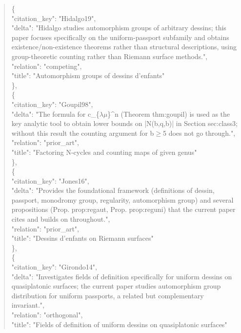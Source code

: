 \documentclass[11pt]{article}
\begin{document}
\begin{quote}
    \{\\
      "citation\_key": "Hidalgo19",\\
      "delta": "Hidalgo studies automorphism groups of arbitrary dessins; this paper focuses specifically on the uniform-passport subfamily and obtains existence/non-existence theorems rather than structural descriptions, using group-theoretic counting rather than Riemann surface methods.",\\
      "relation": "competing",\\
      "title": "Automorphism groups of dessins d'enfants"\\
    \},\\
    \{\\
      "citation\_key": "Goupil98",\\
      "delta": "The formula for c\_\{\ensuremath{\lambda}\ensuremath{\mu}\}\^{}n (Theorem thm:goupil) is used as the key analytic tool to obtain lower bounds on |N(b,q,b)| in Section sec:class3; without this result the counting argument for b\ensuremath{\ge}5 does not go through.",\\
      "relation": "prior\_art",\\
      "title": "Factoring N-cycles and counting maps of given genus"\\
    \},\\
    \{\\
      "citation\_key": "Jones16",\\
      "delta": "Provides the foundational framework (definitions of dessin, passport, monodromy group, regularity, automorphism group) and several propositions (Prop. prop:regaut, Prop. prop:reguni) that the current paper cites and builds on throughout.",\\
      "relation": "prior\_art",\\
      "title": "Dessins d'enfants on Riemann surfaces"\\
    \},\\
    \{\\
      "citation\_key": "Girondo14",\\
      "delta": "Investigates fields of definition specifically for uniform dessins on quasiplatonic surfaces; the current paper studies automorphism group distribution for uniform passports, a related but complementary invariant.",\\
      "relation": "orthogonal",\\
      "title": "Fields of definition of uniform dessins on quasiplatonic surfaces"\\

\end{quote}
\end{document}
